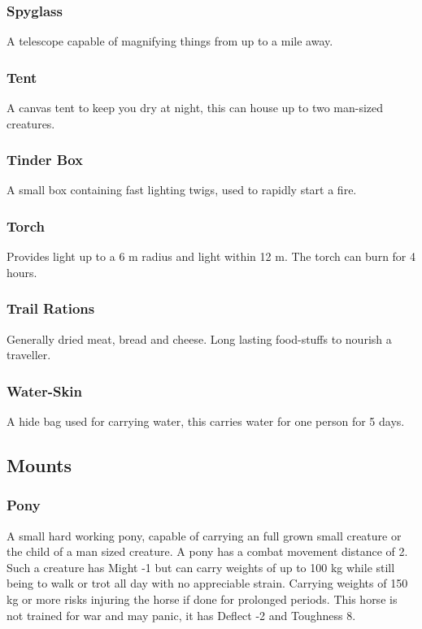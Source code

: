 \subsubsection*{Spyglass}
A telescope capable of magnifying things from up to a mile away.

\subsubsection*{Tent}
A canvas tent to keep you dry at night, this can house up to two man-sized creatures.

\subsubsection*{Tinder Box}
A small box containing fast lighting twigs, used to rapidly start a fire.

\subsubsection*{Torch}
Provides  light up to a 6 m radius and  light within 12 m. The torch can burn for 4 hours.

\subsubsection*{Trail Rations}
Generally dried meat, bread and cheese. Long lasting food-stuffs to nourish a traveller.

\subsubsection*{Water-Skin}
A hide bag used for carrying water, this carries water for one person for 5 days.

\subsection{Mounts}
\subsubsection*{Pony}
A small hard working pony, capable of carrying an full grown small creature or the child of a man sized creature. A pony has a combat movement distance of 2. Such a creature has Might -1 but can carry weights of up to 100 kg while still being to walk or trot all day with no appreciable strain. Carrying weights of 150 kg or more risks injuring the horse if done for prolonged periods. This horse is not trained for war and may panic, it has Deflect -2 and Toughness 8.

